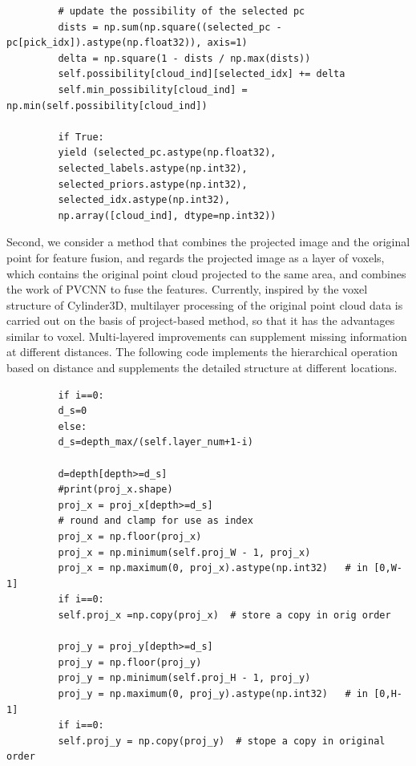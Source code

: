 \documentclass{article}
\begin{document}
\begin{normalsize}
\begin{lstlisting}
         # update the possibility of the selected pc
         dists = np.sum(np.square((selected_pc -pc[pick_idx]).astype(np.float32)), axis=1)
         delta = np.square(1 - dists / np.max(dists))
         self.possibility[cloud_ind][selected_idx] += delta
         self.min_possibility[cloud_ind] = np.min(self.possibility[cloud_ind])
         
         if True:
         yield (selected_pc.astype(np.float32),
         selected_labels.astype(np.int32),
         selected_priors.astype(np.int32),
         selected_idx.astype(np.int32),
         np.array([cloud_ind], dtype=np.int32))
         \end{lstlisting}
         
         Second, we consider a method that combines the projected image and the original point for feature fusion, and regards the projected image as a layer of voxels, which contains the original point cloud projected to the same area, and combines the work of PVCNN to fuse the features. Currently, inspired by the voxel structure of Cylinder3D, multilayer processing of the original point cloud data is carried out on the basis of project-based method, so that it has the advantages similar to voxel. Multi-layered improvements can supplement missing information at different distances. The following code implements the hierarchical operation based on distance and supplements the detailed structure at different locations.
         \begin{lstlisting}
         if i==0:
         d_s=0
         else:
         d_s=depth_max/(self.layer_num+1-i)
         
         d=depth[depth>=d_s]
         #print(proj_x.shape)
         proj_x = proj_x[depth>=d_s]
         # round and clamp for use as index
         proj_x = np.floor(proj_x)
         proj_x = np.minimum(self.proj_W - 1, proj_x)
         proj_x = np.maximum(0, proj_x).astype(np.int32)   # in [0,W-1]
         if i==0:
         self.proj_x =np.copy(proj_x)  # store a copy in orig order
         
         proj_y = proj_y[depth>=d_s]
         proj_y = np.floor(proj_y)
         proj_y = np.minimum(self.proj_H - 1, proj_y)
         proj_y = np.maximum(0, proj_y).astype(np.int32)   # in [0,H-1]
         if i==0:
         self.proj_y = np.copy(proj_y)  # stope a copy in original order
         

\end{lstlisting}
\end{normalsize}
\end{document}
